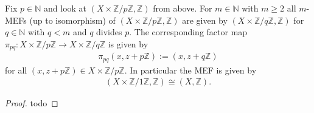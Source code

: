 \begin{example}
	Fix $p \in \mathbb{N}$ and look at $(X \times \mathbb{Z}/p\mathbb{Z}, \mathbb{Z})$ from above. For $m \in \mathbb{N}$ with $m \geq 2$ all $m$-MEFs (up to isomorphism) of $(X \times \mathbb{Z}/p\mathbb{Z}, \mathbb{Z})$ are given by $(X \times \mathbb{Z}/q\mathbb{Z}, \mathbb{Z})$ for $q \in \mathbb{N}$ with $q < m$ and $q$ divides $p$. The corresponding factor map $\pi_{pq}: X \times \mathbb{Z}/p\mathbb{Z} \to X \times \mathbb{Z}/q\mathbb{Z}$ is given by
	\begin{align*}
		\pi_{pq}(x, z + p\mathbb{Z}) := (x, z + q\mathbb{Z})
	\end{align*}
	for all $(x, z + p\mathbb{Z}) \in X \times \mathbb{Z}/p\mathbb{Z}$. In particular the MEF is given by
	\begin{align*}
		(X \times \mathbb{Z}/1\mathbb{Z}, \mathbb{Z}) \cong (X, \mathbb{Z}).
	\end{align*}
\end{example}
\begin{proof}
	todo
\end{proof}
